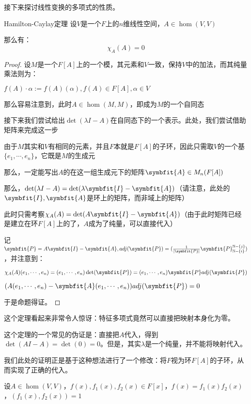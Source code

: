 \documentclass[12pt, a4paper, oneside, UTF8]{ctexbook}
\begin{document}
			接下来探讨线性变换的多项式的性质。
			\begin{para}{0}
					\begin{them}{Hamilton-Caylay定理}{}
						设$V$是一个$F$上的$n$维线性空间，$A \in \hom(V,V)$

						那么有：
						\begin{equation}
							\chi_A(A)=0
						\end{equation}
					\end{them}
					\begin{proof}
						设$M$是一个$F[A]$上的一个模，其元素和$V$一致，保持$V$中的加法，而其纯量乘法则为：

						$f(A)\cdot \alpha := f(A)(\alpha ),f(A) \in F[A],\alpha \in V$

						那么容易注意到，此时$A \in \hom(M,M)$，即成为$M$的一个自同态

						接下来我们尝试给出$\det(\lambda I-A)$在自同态下的一个表示。此处，我们尝试借助矩阵来完成这一步

						由于$M$其实和$V$有相同的元素，并且$F$本就是$F[A]$的子环，因此只需取$V$的一个基$\{e_1,\cdots,e_n\}$，它既是$M$的生成元

						那么，一定能写出$A$的在这一组生成元下的矩阵$\symbfit{A} \in M_n(F[A])$

						那么，$\det(\lambda I-A)=\det(\lambda \symbfit{I}-\symbfit{A})$（请注意，此处的$\symbfit{I},\symbfit{A}$是环上的矩阵，而非域上的矩阵）

						此时只需考察$\chi_A(A)=\det(A\symbfit{I}-\symbfit{A})$（由于此时矩阵已经是建立在环$F[A]$上的了，$A$成为了纯量，可以直接代入）

						记$\symbfit{P}=A\symbfit{I}-\symbfit{A},adj(\symbfit{P})=(\frac{1}{|\symbfit{P}|}\symbfit{P}_{\N-\{i\}}^{\N-\{j\}})$，并注意到：

						$\chi_A(A)(e_1,\cdots,e_n)=(e_1,\cdots,e_n)\det(\symbfit{P})=(e_1,\cdots,e_n)\symbfit{P}adj(\symbfit{P})$

						$(A(e_1,\cdots,e_n)-\symbfit{A}(e_1,\cdots,e_n))adj(\symbfit{P})=0$

						于是命题得证。
					\end{proof}
					这个定理看起来非常令人惊讶：特征多项式竟然可以直接把映射本身化为零。

					这个定理的一个常见的伪证是：直接把$A$代入，得到$\det(AI-A)=\det(0)=0$。但是，其实$\lambda $是一个纯量，并不能将映射代入。

					我们此处的证明正是基于这种想法进行了一个修改：将$F$视为环$F[A]$的子环，从而实现了正确的代入。
				\point{}
					\begin{proposition}
						设$A \in \hom(V,V)$，$f(x),f_1(x),f_2(x) \in F[x]$，$f(x)=f_1(x)f_2(x)$，$(f_1(x),f_2(x))=1$


\end{proposition}
\end{para}
\end{document}
